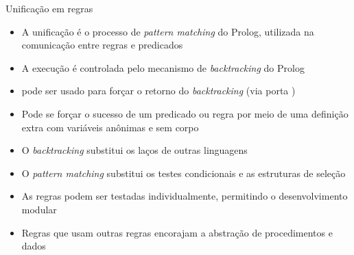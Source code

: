 \begin{frame}[fragile]{Unificação em regras}

    \begin{itemize}
        \item A unificação é o processo de \textit{pattern matching} do Prolog, utilizada na 
            comunicação entre regras e predicados

        \item A execução é controlada pelo mecanismo de \textit{backtracking} do Prolog

        \item {} pode ser usado para forçar o retorno do 
            \textit{backtracking} (via porta )

        \item Pode se forçar o sucesso de um predicado ou regra por meio de uma definição 
            extra com variáveis anônimas e sem corpo

        \item O \textit{backtracking} substitui os laços de outras linguagens

        \item O \textit{pattern matching} substitui os testes condicionais e as estruturas de 
            seleção

        \item As regras podem ser testadas individualmente, permitindo o desenvolvimento 
            modular

        \item Regras que usam outras regras encorajam a abstração de procedimentos e dados

    \end{itemize}

\end{frame}

